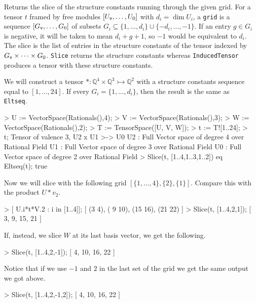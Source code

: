 Returns the slice of the structure constants running through the given grid. For
a tensor $t$ framed by free modules $[U_{\operatorname{\mathtt{v}}},\dots,U_0]$ with $d_i=\dim U_i$,
a \texttt{grid} is a sequence $[G_{\operatorname{\mathtt{v}}},\dots,G_0]$ of subsets $G_i\subseteq
\{1,\dots, d_i\}\cup \{-d_i,\dots, -1\}$. If an entry $g\in G_i$ is negative, it
will be taken to mean $d_i+g+1$, so $-1$ would be equivalent to $d_i$. The slice
is the list of entries in the structure constants of the tensor indexed by
$G_{\operatorname{\mathtt{v}}}\times \cdots \times G_0$. \texttt{Slice} returns the structure
constants whereas \texttt{InducedTensor} produces a tensor with these structure
constants.

\begin{example}[TensorSlicing]

We will construct a tensor $*: \mathbb{Q}^4\times \mathbb{Q}^3\rightarrowtail
\mathbb{Q}^2$ with a structure constants sequence equal to $[1,\dots,24]$. If
every $G_i=\{1,\dots, d_i\}$, then the result is the same as \texttt{Eltseq}.
\begin{code}
> U := VectorSpace(Rationals(),4);
> V := VectorSpace(Rationals(),3);
> W := VectorSpace(Rationals(),2);
> T := TensorSpace([U, V, W]);
> t := T![1..24];
> t;
Tensor of valence 3, U2 x U1 >-> U0
U2 : Full Vector space of degree 4 over Rational Field
U1 : Full Vector space of degree 3 over Rational Field
U0 : Full Vector space of degree 2 over Rational Field
> Slice(t, [{1..4},{1..3},{1..2}]) eq Eltseq(t);
true
\end{code}

Now we will slice with the following grid $[\{1,\dots,4\}, \{2\}, \{1\}]$. 
Compare this with the product $U*v_2$.
\begin{code}
> [ U.i*t*V.2 : i in [1..4]];
[
    (3 4),
    ( 9 10),
    (15 16),
    (21 22)
]
> Slice(t, [{1..4},{2},{1}]); 
[ 3, 9, 15, 21 ]
\end{code}

If, instead, we slice $W$ at its last basis vector, we get the following.
\begin{code}
> Slice(t, [{1..4},{2},{-1}]);
[ 4, 10, 16, 22 ]
\end{code}

Notice that if we use $-1$ and $2$ in the last set of the grid we get the same
output we got above.
\begin{code}
> Slice(t, [{1..4},{2},{-1,2}]);
[ 4, 10, 16, 22 ]
\end{code}


\end{example}
